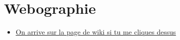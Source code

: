 \documentclass[a4paper,french,titlepage]{article} \usepackage{knonn_layout}
\begin{document}
	\section{Webographie}
		\begin{itemize}
			\item \href{https://wikipedia.org}{\underline{On arrive sur la page de \gls{wiki} si tu me cliques dessus}}
		\end{itemize}
    \printnoidxglossaries
\end{document}
